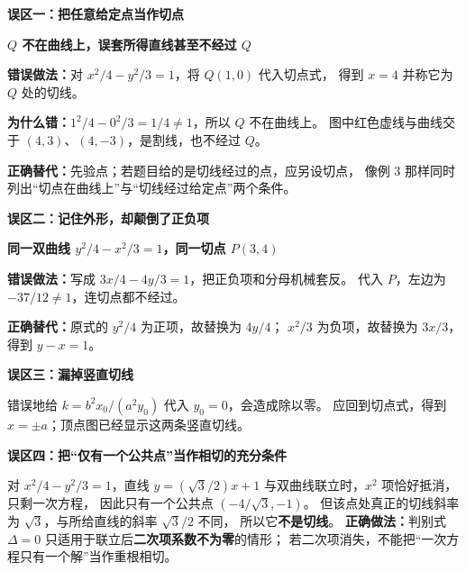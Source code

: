 \clearpage
\begin{trapbox}
\textbf{误区一：把任意给定点当作切点}
\begin{center}
\textbf{$Q$ 不在曲线上，误套所得直线甚至不经过 $Q$}\par\medskip

\end{center}
\textbf{错误做法：}对 $x^2/4-y^2/3=1$，将 $Q(1,0)$ 代入切点式，
得到 $x=4$ 并称它为 $Q$ 处的切线。

\textbf{为什么错：}$1^2/4-0^2/3=1/4\ne1$，所以 $Q$ 不在曲线上。
图中红色虚线与曲线交于 $(4,3)$、$(4,-3)$，是割线，也不经过 $Q$。

\textbf{正确替代：}先验点；若题目给的是切线经过的点，应另设切点，
像例 3 那样同时列出“切点在曲线上”与“切线经过给定点”两个条件。
\end{trapbox}
\clearpage
\begin{trapbox}
\textbf{误区二：记住外形，却颠倒了正负项}
\begin{center}
\textbf{同一双曲线 $y^2/4-x^2/3=1$，同一切点 $P(3,4)$}\par\medskip

\end{center}
\textbf{错误做法：}写成 $3x/4-4y/3=1$，把正负项和分母机械套反。
代入 $P$，左边为 $-37/12\ne1$，连切点都不经过。

\textbf{正确替代：}原式的 $y^2/4$ 为正项，故替换为 $4y/4$；
$x^2/3$ 为负项，故替换为 $3x/3$，得到 $y-x=1$。

\textbf{误区三：漏掉竖直切线}

错误地给 $k=b^2x_0/(a^2y_0)$ 代入 $y_0=0$，会造成除以零。
应回到切点式，得到 $x=\pm a$；顶点图已经显示这两条竖直切线。

\medskip
\textbf{误区四：把“仅有一个公共点”当作相切的充分条件}

对 $x^2/4-y^2/3=1$，直线 $y=(\sqrt3/2)x+1$
与双曲线联立时，$x^2$ 项恰好抵消，只剩一次方程，
因此只有一个公共点 $(-4/\sqrt3,-1)$。
但该点处真正的切线斜率为 $\sqrt3$，与所给直线的斜率 $\sqrt3/2$ 不同，
所以它\textbf{不是切线}。
\textbf{正确做法：}判别式 $\Delta=0$ 只适用于联立后\textbf{二次项系数不为零}的情形；
若二次项消失，不能把“一次方程只有一个解”当作重根相切。
\end{trapbox}
